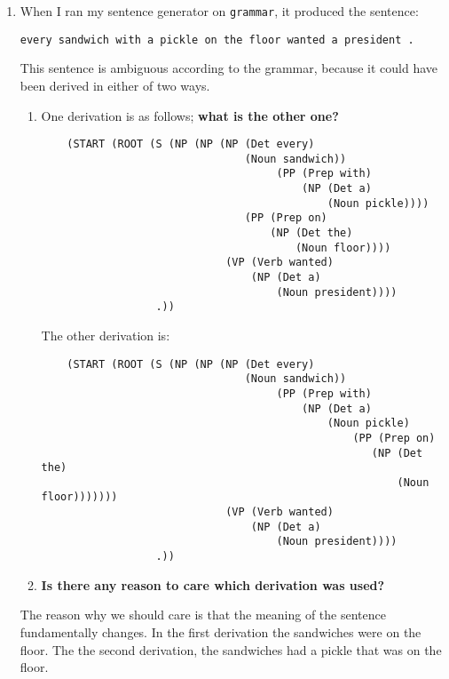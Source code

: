 \documentclass[10pt]{article}
\begin{document}
\begin{enumerate}
\item When I ran my sentence generator on \verb|grammar|, it produced
  the sentence:
\begin{verbatim}
every sandwich with a pickle on the floor wanted a president .
\end{verbatim}
\noindent
This sentence is ambiguous according to the grammar, because it could
have been derived in either of two ways.
\begin{enumerate}
\item  One derivation is as follows; {\bf what is the other one?}

\bigskip
\begin{verbatim}
    (START (ROOT (S (NP (NP (NP (Det every)
                                (Noun sandwich))
                                     (PP (Prep with)
                                         (NP (Det a)
                                             (Noun pickle))))
                                (PP (Prep on)
                                    (NP (Det the)
                                        (Noun floor))))
                             (VP (Verb wanted)
                                 (NP (Det a)
                                     (Noun president))))
                  .))
\end{verbatim}

The other derivation is: 

\bigskip
\begin{verbatim}
    (START (ROOT (S (NP (NP (NP (Det every)
                                (Noun sandwich))
                                     (PP (Prep with)
                                         (NP (Det a)
                                             (Noun pickle)
                                                 (PP (Prep on)
                                                    (NP (Det the)
                                                        (Noun floor)))))))
                             (VP (Verb wanted)
                                 (NP (Det a)
                                     (Noun president))))
                  .))
\end{verbatim}


\item {\bf Is there any reason to care which derivation was used?}
\end{enumerate}

The reason why we should care is that the meaning of the sentence fundamentally changes. In the first derivation the sandwiches were on the floor. The the second derivation, the sandwiches had a pickle that was on the floor.


\end{enumerate}
\end{document}
